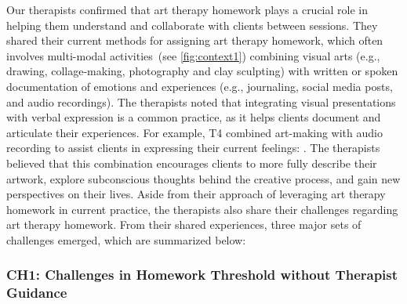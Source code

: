 Our therapists confirmed that art therapy homework plays a crucial role in helping them understand and collaborate with clients between sessions. They shared their current methods for assigning art therapy homework, which often involves multi-modal activities~(see \autoref{fig:context1}) combining visual arts (e.g., drawing, collage-making, photography and clay sculpting) with written or spoken documentation of emotions and experiences (e.g., journaling, social media posts, and audio recordings).
The therapists noted that integrating visual presentations with verbal expression is a common practice, as it helps clients document and articulate their experiences. For example, T4 combined art-making with audio recording to assist clients in expressing their current feelings: . The therapists believed that this combination encourages clients to more fully describe their artwork, explore subconscious thoughts behind the creative process, and gain new perspectives on their lives.
Aside from their approach of leveraging art therapy homework in current practice, the therapists also share their challenges regarding art therapy homework. From their shared experiences, three major sets of challenges emerged, which are summarized below:

\subsubsection{\textbf{CH1}: Challenges in Homework Threshold without Therapist Guidance} 

